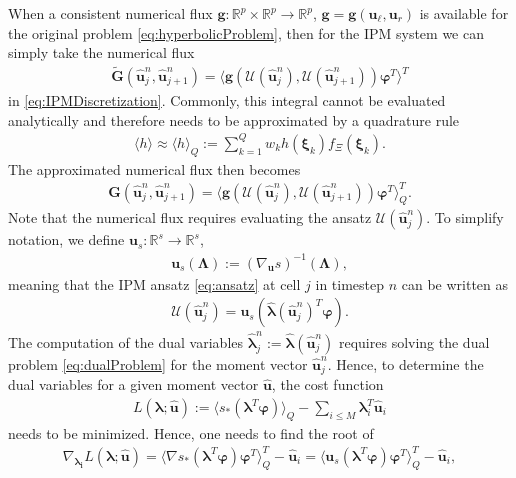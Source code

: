 When a consistent numerical flux $\bm g:\mathbb{R}^p\times\mathbb{R}^p\to\mathbb{R}^p$, $\bm g = \bm g(\bm u_\ell, \bm u_r)$ is available for the original problem \eqref{eq:hyperbolicProblem}, then for the IPM system we can simply take the numerical flux
\begin{align*}
 \bm{\tilde G}(\bm{\hat u}_{j}^n,\bm{\hat u}_{j+1}^{n}) = \langle \bm g(\mathcal{U}(\bm{\hat u}_j^n),\mathcal{U}(\bm{\hat u}_{j+1}^n))\bm{\varphi}^T\rangle^T
\end{align*}
in \eqref{eq:IPMDiscretization}. Commonly, this integral cannot be evaluated analytically and therefore needs to be approximated by a quadrature rule
\begin{align*}
\langle h \rangle \approx \langle h \rangle_{Q} := \sum_{k=1}^Q w_k h(\bm{\xi}_k)f_{\Xi}(\bm{\xi}_k).
\end{align*}
The approximated numerical flux then becomes
\begin{align}\label{eq:numericalFluxIPM}
 \bm{G}(\bm{\hat u}_{j}^n,\bm{\hat u}_{j+1}^{n}) = \langle \bm g(\mathcal{U}(\bm{\hat u}_j^n),\mathcal{U}(\bm{\hat u}_{j+1}^n))\bm{\varphi}^T\rangle^T_Q.
\end{align}
Note that the numerical flux requires evaluating the ansatz $\mathcal{U}(\bm{\hat u}_j^n)$. To simplify notation, we define $\bm{u}_{s}:\mathbb{R}^s \to \mathbb{R}^s$,
\begin{align*}
\bm{u}_{s}(\bm\Lambda):=\left( \nabla_{\bm{u}} s \right)^{-1}(\bm\Lambda),
\end{align*}
meaning that the IPM ansatz \eqref{eq:ansatz} at cell $j$ in timestep $n$ can be written as
\begin{align*}
\mathcal{U}(\bm{\hat u}_j^n) = \bm{u}_{s}(\bm{\hat{\lambda}}(\bm{\hat u}_j^n)^T \bm{\varphi}).
\end{align*}
The computation of the dual variables $\bm{\hat\lambda}_j^n:=\bm{\hat\lambda}(\bm{\hat u}_j^n)$ requires solving the dual problem \eqref{eq:dualProblem} for the moment vector $\bm{\hat u}_{j}^{n}$. Hence, to determine the dual variables for a given moment vector $\bm{\hat{u}}$, the cost function
\begin{align}\label{eq:L}
L(\bm{\lambda};\bm{\hat{u}}) := \langle s_*(\bm{\lambda}^T \bm\varphi)\rangle_Q - \sum_{i\leq M}\bm{\lambda}_i^T \bm{\hat u}_i
\end{align}
needs to be minimized. Hence, one needs to find the root of
\begin{align*}
\nabla_{\bm{\lambda_i}}L(\bm{\lambda};\bm{\hat{u}}) = \langle \nabla s_*(\bm{\lambda}^T \bm\varphi)\bm\varphi^T\rangle_Q^T - \bm{\hat u}_i = \langle \bm u_s(\bm{\lambda}^T \bm\varphi)\bm\varphi^T\rangle_Q^T - \bm{\hat u}_i,
\end{align*}
